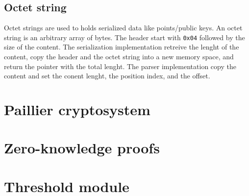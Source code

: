 \subsection{Octet string}

Octet strings are used to holds serialized data like points/public keys.
An octet string is an arbitrary array of bytes. The header start with \texttt{0x04}
followed by the size of the content. The serialization implementation retreive
the lenght of the content, copy the header and the octet string into a new memory
space, and return the pointer with the total lenght. The parser implementation
copy the content and set the conent lenght, the position index, and the offset.


\section{Paillier cryptosystem}
\lipsum[1-2]

\section{Zero-knowledge proofs}
\lipsum[1-2]

\section{Threshold module}
\lipsum[1-2]
